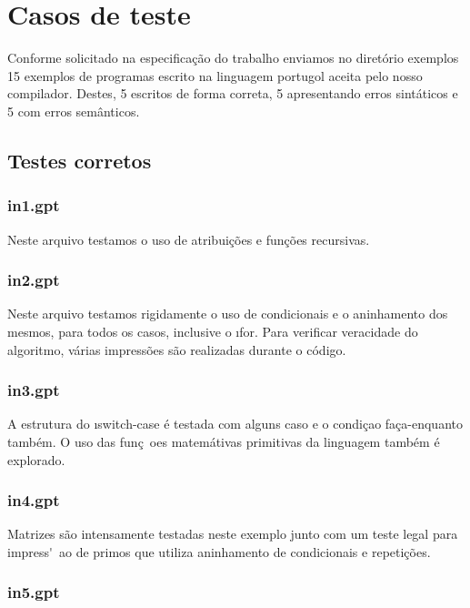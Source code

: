 \documentclass[a4paper,12pt]{report}
\begin{document}
\section{Casos de teste}

Conforme solicitado na especifica\c{c}\~ao do trabalho enviamos no diret\'orio exemplos 15
exemplos de programas escrito na linguagem portugol aceita pelo nosso compilador. 
Destes, 5 escritos de forma correta, 5 apresentando erros sint\'aticos e 5 com erros 
sem\^anticos.

\subsection{Testes corretos}

\subsubsection{in1.gpt}

Neste arquivo testamos o uso de atribui\c{c}\~oes e fun\c{c}\~oes recursivas.

\subsubsection{in2.gpt}

Neste arquivo testamos rigidamente o uso de condicionais e o aninhamento dos mesmos, para todos os casos, inclusive o \i{for}. Para verificar veracidade do algoritmo, v\'arias impress\~oes s\~ao realizadas durante o c\'odigo. 

\subsubsection{in3.gpt}

A estrutura do \i{switch-case} \'e testada com alguns caso e o condi\c{c}ao fa\c{c}a-enquanto tamb\'em. O uso das fun\c{c}~oes matem\'ativas primitivas da linguagem tamb\'em \'e explorado.

\subsubsection{in4.gpt}

Matrizes s\~ao intensamente testadas neste exemplo junto com um teste legal para impress\'~ao de primos que utiliza aninhamento de condicionais e repeti\c{c}\~oes. 

\subsubsection{in5.gpt}
\end{document}

